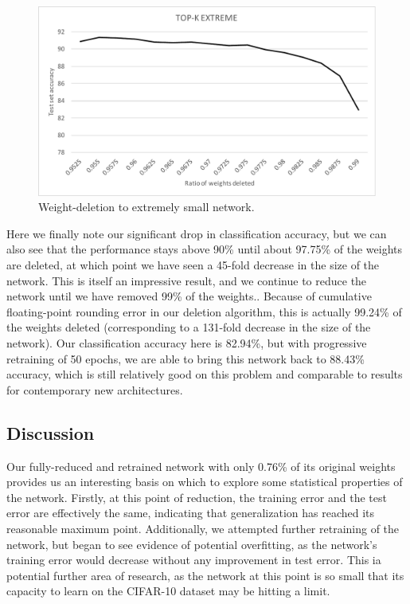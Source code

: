 \documentclass[10pt,twocolumn,letterpaper]{article}
\begin{document}
\begin{figure}[h]
  \centering
  \includegraphics[width=\linewidth]{cifar-top-k-extreme.pdf}
  \caption{Weight-deletion to extremely small network.}
  \label{fig:vgg-extreme}
\end{figure}

Here we finally note our significant drop in classification accuracy, but we can also see that the performance stays above 90\% until about 97.75\% of the weights are deleted, at which point we have seen a 45-fold decrease in the size of the network.
This is itself an impressive result, and we continue to reduce the network until we have removed 99\% of the weights..
Because of cumulative floating-point rounding error in our deletion algorithm, this is actually 99.24\% of the weights deleted (corresponding to a 131-fold decrease in the size of the network).
Our classification accuracy here is  82.94\%, but with progressive retraining of 50 epochs, we are able to bring this network back to 88.43\% accuracy, which is still relatively good on this problem and comparable to results for contemporary new architectures.

\subsection{Discussion}
Our fully-reduced and retrained network with only 0.76\% of its original weights provides us an interesting basis on which to explore some statistical properties of the network.
Firstly, at this point of reduction, the training error and the test error are effectively the same, indicating that generalization has reached its reasonable maximum point.
Additionally, we attempted further retraining of the network, but began to see evidence of potential overfitting, as the network's training error would decrease without any improvement in test error.
This ia potential further area of research, as the network at this point is so small that its capacity to learn on the CIFAR-10 dataset may be hitting a limit.
\end{document}
